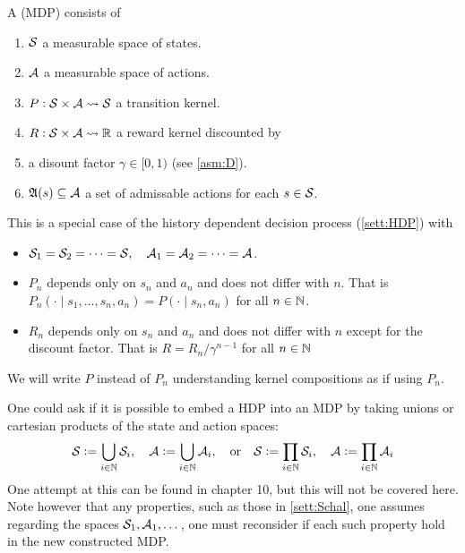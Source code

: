 \begin{defn}
  A  (MDP) consists of
  \begin{enumerate}
    \item $\mathcal{S}$ a 
      measurable space of states.
    \item $\mathcal{A}$ a 
      measurable space of actions.
    \item $P : \mathcal{S} \times \mathcal{A} \leadsto \mathcal{S}$
      a transition kernel.
    \item $R : \mathcal{S} \times \mathcal{A} \leadsto \mathbb{R}$
      a reward kernel discounted by
    \item a disount factor $\gamma \in [0,1)$ (see \cref{asm:D}).
    \item $\frak{A}(s) \subseteq \mathcal{A}$ a set of admissable actions
      for each $s \in \mathcal{S}$.
  \end{enumerate}
  \label{sett:MDP}
\end{defn}
\begin{rem}
  This is a special case of the
  history dependent decision process (\cref{sett:HDP}) with
  \begin{itemize}
    \item 
      $\mathcal{S}_1 = \mathcal{S}_2 = \dots = \mathcal{S},
      \quad \mathcal{A}_1 = \mathcal{A}_2 = \dots = \mathcal{A}$.
    \item $P_n$ depends only on $s_n$ and $a_n$ and does not
      differ with $n$. That is
      $P_n(\cdot \mid s_1, \dots, s_n, a_n) = P(\cdot \mid s_n, a_n)$
      for all $n \in \mathbb{N}$.
    \item $R_n$ depends only on $s_n$ and $a_n$ and does not differ
      with $n$ except for the discount factor.
      That is $R = R_n/\gamma^{n-1}$ for all $n \in \mathbb{N}$
  \end{itemize}
  We will write $P$ instead of $P_n$ understanding
  kernel compositions as if using $P_n$.
\end{rem}

\begin{rem}
  One could ask if it is possible to embed a HDP into an MDP
  by taking unions or cartesian products of the state and action spaces:
  \[ \mathcal{S} \vcentcolon= \bigcup_{i\in\mathbb{N}} \mathcal{S}_i, \quad
    \mathcal{A} \vcentcolon= \bigcup_{i\in\mathbb{N}} \mathcal{A}_i,
    \quad \mathrm{or} \quad
    \mathcal{S} \vcentcolon= \prod_{i\in\mathbb{N}} \mathcal{S}_i, \quad
  \mathcal{A} \vcentcolon= \prod_{i\in\mathbb{N}} \mathcal{A}_i \]
  One attempt at this can be found in  chapter 10,
  but this will not be covered here. %
  Note however that any properties, such as those in \cref{sett:Schal},
  one assumes regarding the spaces $\mathcal{S}_1, \mathcal{A}_1, \dots$, one must 
  reconsider if each such property hold in the new constructed MDP.
\end{rem}

